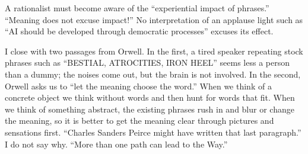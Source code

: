 A rationalist must become aware of the ``experiential impact of phrases.'' ``Meaning does not excuse impact!'' No interpretation of an applause light such as ``AI should be developed through democratic processes'' excuses its effect. 

I close with two passages from Orwell. In the first, a tired speaker repeating stock phrases such as ``BESTIAL, ATROCITIES, IRON HEEL'' seems less a person than a dummy; the noises come out, but the brain is not involved. In the second, Orwell asks us to ``let the meaning choose the word.'' When we think of a concrete object we think without words and then hunt for words that fit. When we think of something abstract, the existing phrases rush in and blur or change the meaning, so it is better to get the meaning clear through pictures and sensations first.  ``Charles Sanders Peirce might have written that last paragraph.'' I do not say why. ``More than one path can lead to the Way.''
